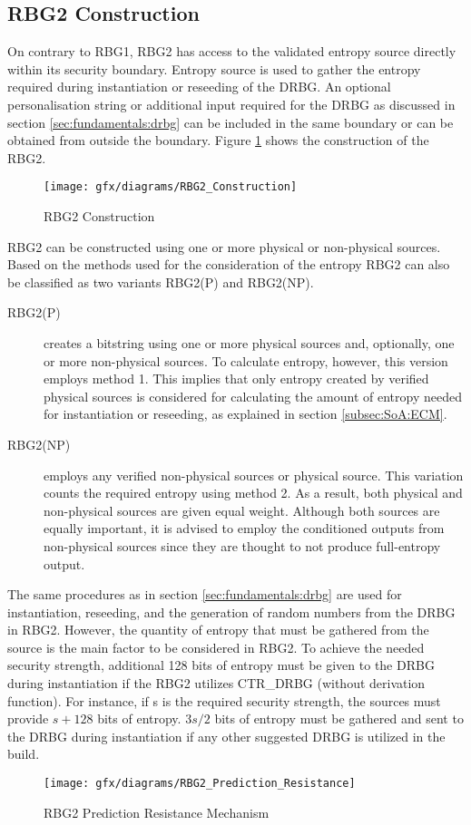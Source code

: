 %
%
\subsection{RBG2 Construction}
\label{subsec:SoA:RBG2}
On contrary to RBG1, RBG2 has access to the validated entropy source directly within its security boundary. Entropy source is used to gather the entropy required during instantiation or reseeding of the DRBG. An optional personalisation string or additional input required for the DRBG as discussed in section \ref{sec:fundamentals:drbg} can be included in the same boundary or can be obtained from outside the boundary. Figure \ref{fig:3:3} shows the construction of the RBG2.
\begin{figure}[htbp]
	\centering
	\texttt{[image: gfx/diagrams/RBG2\_Construction]}
	\caption{RBG2 Construction}
	\label{fig:3:3}
\end{figure}
RBG2 can be constructed using one or more physical or non-physical sources. Based on the methods used for the consideration of the entropy RBG2 can also be classified as two variants RBG2(P) and RBG2(NP).
\begin{description}
	\item[RBG2(P)] creates a bitstring using one or more physical sources and, optionally, one or more non-physical sources. To calculate entropy, however, this version employs method 1. This implies that only entropy created by verified physical sources is considered for calculating the amount of entropy needed for instantiation or reseeding, as explained in section \ref{subsec:SoA:ECM}.
	\item[RBG2(NP)] employs any verified non-physical sources or physical source. This variation counts the required entropy using method 2. As a result, both physical and non-physical sources are given equal weight. Although both sources are equally important, it is advised to employ the conditioned outputs from non-physical sources since they are thought to not produce full-entropy output.
\end{description}

The same procedures as in section \ref{sec:fundamentals:drbg} are used for instantiation, reseeding, and the generation of random numbers from the DRBG in RBG2. However, the quantity of entropy that must be gathered from the source is the main factor to be considered in RBG2. To achieve the needed security strength, additional 128 bits of entropy must be given to the DRBG during instantiation if the RBG2 utilizes CTR\_DRBG (without derivation function). For instance, if s is the required security strength, the sources must provide $s+128$ bits of entropy. $3s/2$ bits of entropy must be gathered and sent to the DRBG during instantiation if any other suggested DRBG is utilized in the build.
\begin{figure}[htbp]
	\centering
	\texttt{[image: gfx/diagrams/RBG2\_Prediction\_Resistance]}
	\caption{RBG2 Prediction Resistance Mechanism}
	\label{fig:3:4}
\end{figure}


